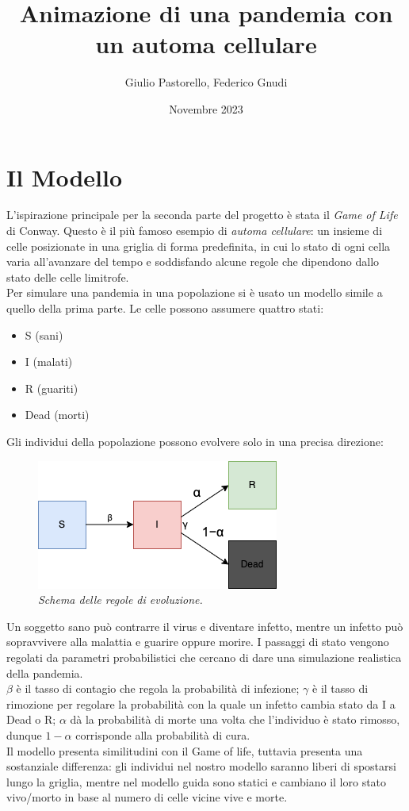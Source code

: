 \documentclass{article}
\title{Animazione di una pandemia con un automa cellulare}
\author{Giulio Pastorello, Federico Gnudi}
\date{Novembre 2023}
\begin{document}
\maketitle

\section{Il Modello}

\hspace{\parindent}L'ispirazione principale per la seconda parte del progetto è 
stata il \textit{Game of Life} di Conway. Questo è il più famoso esempio di 
\textit{automa cellulare}: un insieme di celle posizionate in una griglia di forma 
predefinita, in cui lo stato di ogni cella varia all'avanzare del tempo e 
soddisfando alcune regole che dipendono dallo stato delle celle limitrofe. \\
Per simulare una pandemia  in una popolazione si è usato un modello simile a 
quello della prima parte. Le celle possono assumere quattro stati: 
\begin{itemize}
    \item S (sani)
    \item I (malati)
    \item R (guariti)
    \item Dead (morti)
\end{itemize}
Gli individui della popolazione possono evolvere solo in una precisa direzione: \\
\begin{figure}
    \centering
    \includegraphics[width=0.4\paperwidth]{virus.drawio.png}
    \caption{\textit{Schema delle regole di evoluzione.}}
    \label{fig::virus}
\end{figure}
Un soggetto sano può contrarre il virus e diventare infetto, mentre un infetto
può sopravvivere alla malattia e guarire oppure morire. I passaggi di stato 
vengono regolati da parametri probabilistici che cercano di dare una simulazione
realistica della pandemia. \\
$\beta$ è il tasso di contagio che regola la probabilità di infezione; $\gamma$ è 
il tasso di rimozione per regolare la probabilità con la quale un infetto cambia 
stato da I a Dead o R; $\alpha$ dà la probabilità di morte una volta 
che l'individuo è stato rimosso, dunque $1-\alpha$ corrisponde alla probabilità di 
cura. \\
Il modello presenta similitudini con il Game of life, tuttavia presenta una 
sostanziale differenza: gli individui nel nostro modello saranno liberi di spostarsi 
lungo la griglia, mentre nel modello guida sono statici e cambiano il loro stato 
vivo/morto in base al numero di celle vicine vive e morte. 
\end{document}
